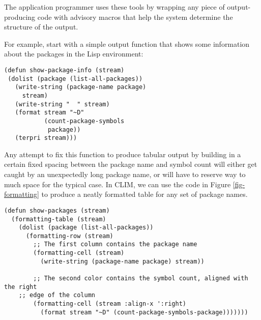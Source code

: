 \documentclass[twocolumn,a4paper]{article}
\newcommand {\CLIM}{{\small CLIM}}
\begin{document}
The application programmer uses these tools by wrapping any piece of
output-producing code with advisory macros that help the system
determine the structure of the output.

For example, start with a simple output function that shows some
information about the packages in the Lisp environment:
\lstset{style=inlinestyle}
\begin{lstlisting}
(defun show-package-info (stream)
 (dolist (package (list-all-packages)) 
   (write-string (package-name package) 
     stream)
   (write-string "  " stream) 
   (format stream "~D" 
           (count-package-symbols 
            package)) 
   (terpri stream)))
\end{lstlisting}
Any attempt to fix this function to produce tabular output by building
in a certain fixed spacing between the package name and symbol count
will either get caught by an unexpectedly long package name, or will
have to reserve way to much space for the typical case. In \CLIM{}, we
can use the code in Figure \ref{fig-formatting} to produce a neatly
formatted table for any set of package names.
\begin{figure*}
\lstset{style=framestyle}
\begin{lstlisting}
(defun show-packages (stream)
  (formatting-table (stream)
    (dolist (package (list-all-packages))
      (formatting-row (stream)
        ;; The first column contains the package name
        (formatting-cell (stream)
          (write-string (package-name package) stream))

        ;; The second color contains the symbol count, aligned with the right 
	;; edge of the column 
        (formatting-cell (stream :align-x ':right)
          (format stream "~D" (count-package-symbols-package)))))))
\end{lstlisting}
\caption{An output function that uses table formatting.}\label{fig-formatting}
\end{figure*}

\end{document}
